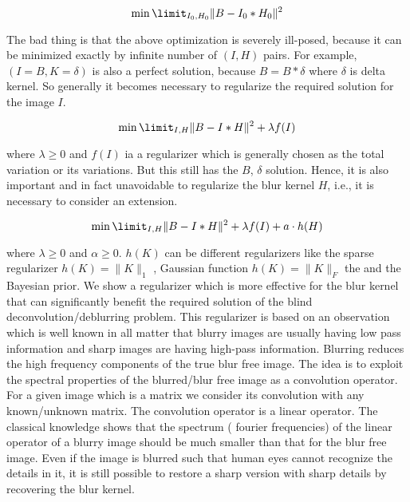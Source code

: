 \documentclass{article}
\begin{document}
\begin{equation}
    \min\limit_{I_0, H_0} \|B - I_0 * H_0\|^2
\end{equation}

The bad thing is that the above optimization is severely ill-posed, because it can be minimized exactly by infinite number of  $(I, H)$ pairs. For example,  $(I = B, K = δ)$ is also a perfect solution, because $B = B * \delta$ where $\delta$ is delta kernel. So generally it becomes necessary to regularize the required solution for the image $I$.

\begin{equation}
    \min\limit_{I, H} \|B - I * H\|^2 + \lambda f(I)
\end{equation}

where $\lambda \geq 0$ and $f(I)$ ia a regularizer which is generally chosen as the total variation or its variations. But this still has the $B$, $\delta$ solution. Hence, it is also important and in fact unavoidable to regularize the blur kernel $H$, i.e., it is necessary to consider an extension.

\begin{equation}
    \min\limit_{I, H} \|B - I * H\|^2 + \lambda f(I) + a \cdot h(H)
\end{equation}

where $\lambda \geq 0$ and $\alpha \geq 0$. $h(K)$ can be different regularizers like the sparse regularizer $h(K)=\|K\|_1$ , Gaussian function $h(K) =\|K\|_F$  the and the Bayesian prior. We show a regularizer which is more effective for the blur kernel that can significantly benefit the required solution of the blind deconvolution/deblurring problem. This regularizer is based on an observation which is well known in all matter that blurry images are usually having low pass information and sharp images are having high-pass information. Blurring reduces the high frequency components of the true blur free image. The idea is to exploit the spectral properties of the blurred/blur free image as a convolution operator. \\

For a given image which is a matrix we consider its convolution with any known/unknown matrix. The convolution operator is a linear operator. The classical knowledge shows that the spectrum ( fourier frequencies) of the linear operator of a blurry image should be much smaller than that for the blur free image.  Even if the image is blurred such that human eyes cannot recognize the details in it, it is still possible to restore a sharp version with sharp details by recovering the blur kernel. \\
\end{document}
